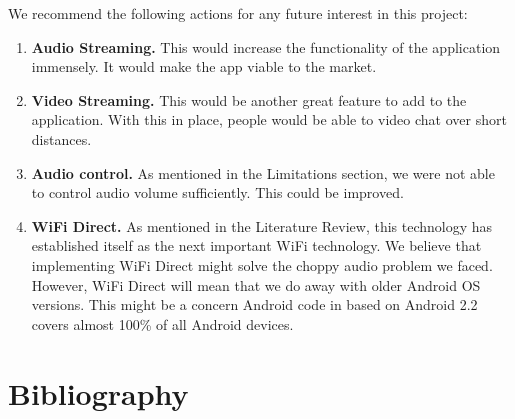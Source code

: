 \documentclass[12pt,svgnames,smaller]{article} %
\begin{document}
	We recommend the following actions for any future interest in this project:
	
	\begin{enumerate}
		\item \textbf{Audio Streaming.} This would increase the functionality of the application immensely. It would make the app viable to the market.
		\item \textbf{Video Streaming.} This would be another great feature to add to the application. With this in place, people would be able to video chat over short distances.
		\item  \textbf{Audio control.} As mentioned in the Limitations section, we were not able to control audio volume sufficiently. This could be improved.
		\item \textbf{WiFi Direct.} As mentioned in the Literature Review, this technology has established itself as the next important WiFi technology. We believe that implementing WiFi Direct might solve the choppy audio problem we faced. However, WiFi Direct will mean that we do away with older Android OS versions. This might be a concern Android code in based on Android 2.2 covers almost 100\% of all Android devices. 
	\end{enumerate}
	
	
\clearpage

\newpage
	
	\newpage
	
	\section{\textbf{ Bibliography } } 
	
\end{document}
